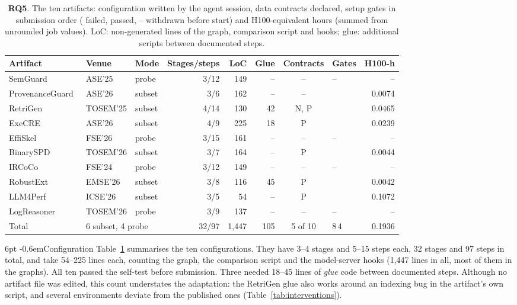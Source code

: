 \documentclass[pdflatex,sn-mathphys-num]{sn-jnl}
\makeatletter
\theoremstyle{thmstyletwo}%
\theoremstyle{thmstylethree}%
\newcommand{\RQ}[1]{\textbf{RQ#1}}
\newcommand{\cmark}{\ding{51}}
\newcommand{\xmark}{\ding{55}}
\renewcommand\paragraph{\@startsection{paragraph}{4}{\z@}%
  {6pt \@plus 2pt \@minus 1pt}{-0.6em}{\normalfont\normalsize\bfseries}}
\makeatother
\begin{document}
\begin{table}[t]
\centering\footnotesize
\caption{\RQ{5}. The ten artifacts: configuration written by the agent session, data contracts declared, setup gates in submission order (\xmark{} failed, \cmark{} passed, -- withdrawn before start) and H100-equivalent hours (summed from unrounded job values). LoC: non-generated lines of the graph, comparison script and hooks; glue: additional scripts between documented steps.}\label{tab:artifacts}
\setlength{\tabcolsep}{3pt}
\begin{tabular}{@{}l l l r r r c l r@{}}
\toprule
Artifact & Venue & Mode & Stages/steps & LoC & Glue & Contracts & Gates & H100-h \\
\midrule
SemGuard~\cite{wang2025semguard} & ASE'25 & probe & 3/12 & 149 & -- & -- & -- & -- \\
ProvenanceGuard~\cite{she2026provenanceguard} & ASE'26 & subset & 3/6 & 162 & -- & -- & \xmark\cmark & 0.0074 \\
RetriGen~\cite{zhang2025retrigen} & TOSEM'25 & subset & 4/14 & 130 & 42 & N, P & \xmark\xmark & 0.0465 \\
ExeCRE~\cite{dong2026execre} & ASE'26 & subset & 4/9 & 225 & 18 & P & \xmark\xmark\cmark & 0.0239 \\
EffiSkel~\cite{yu2026effiskel} & FSE'26 & probe & 3/15 & 161 & -- & -- & -- & -- \\
BinarySPD~\cite{li2026binaryspd} & TOSEM'26 & subset & 3/7 & 164 & -- & P & \xmark\cmark & 0.0044 \\
IRCoCo~\cite{li2024ircoco} & FSE'24 & probe & 3/12 & 149 & -- & -- & -- & -- \\
RobustExt~\cite{rabbi2026robustness} & EMSE'26 & subset & 3/8 & 116 & 45 & P & \cmark & 0.0042 \\
LLM4Perf~\cite{wang2026llm4perf} & ICSE'26 & subset & 3/5 & 54 & -- & P & \xmark\xmark & 0.1072 \\
LogReasoner~\cite{ma2026logreasoner} & TOSEM'26 & probe & 3/9 & 137 & -- & -- & -- & -- \\
\midrule
Total & \multicolumn{2}{l}{6 subset, 4 probe} & 32/97 & 1{,}447 & 105 & 5 of 10 & 8\xmark\,4\cmark & 0.1936 \\
\bottomrule
\end{tabular}
\end{table}

\paragraph{Configuration} Table~\ref{tab:artifacts} summarises the ten configurations. They have 3--4 stages and 5--15 steps each, 32 stages and 97 steps in total, and take 54--225 lines each, counting the graph, the comparison script and the model-server hooks (1{,}447 lines in all, most of them in the graphs). All ten passed the self-test before submission. Three needed 18--45 lines of \emph{glue} code between documented steps. Although no artifact file was edited, this count understates the adaptation: the RetriGen glue also works around an indexing bug in the artifact's own script, and several environments deviate from the published ones (Table~\ref{tab:interventions}).
\end{document}
